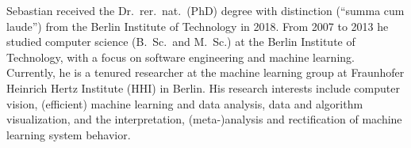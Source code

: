 \documentclass[10pt,a4paper]{article} %
\begin{document}
\spacedhrule{0.9em}{-0.4em} %



\vspace{-1.3em} %

\begin{multicols}{2}  %
\noindent

Sebastian received the Dr.\ rer.\ nat.\ (PhD) degree with distinction (``summa cum laude'') from the Berlin Institute of Technology in 2018.
From 2007 to 2013 he studied computer science (B.\ Sc.\ and M.\ Sc.) at the Berlin Institute of Technology, with a focus on software engineering and machine learning.
Currently, he is a tenured researcher at the machine learning group at Fraunhofer Heinrich Hertz Institute (HHI) in Berlin.
His research interests include computer vision, (efficient) machine learning and data analysis,
data and algorithm visualization, and the interpretation, (meta-)analysis and rectification of machine learning system behavior.

\end{multicols}

\spacedhrule{0.5em}{-0.4em} %




\end{document}
